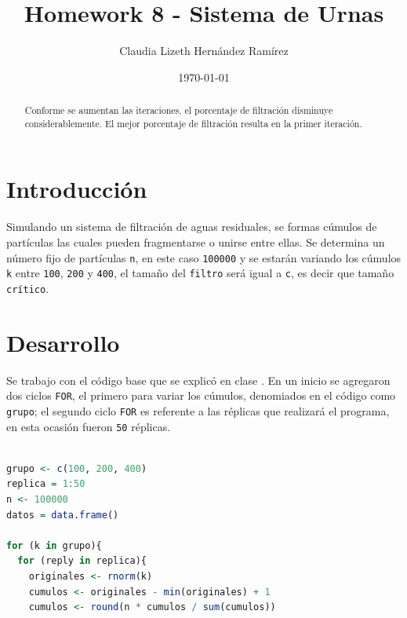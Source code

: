\documentclass{article}
\author{Claudia Lizeth Hern\'andez Ram\'irez} %
\title{Homework 8 - Sistema de Urnas} %
\date{\today}
\begin{document}

\maketitle %

\begin{abstract} %
  \centering
Conforme se aumentan las iteraciones, el porcentaje de filtraci\'on disminuye considerablemente. El mejor porcentaje de filtraci\'on resulta en la primer iteraci\'on.
  
\end{abstract}


\section{Introducci\'{o}n}\label{intro} %
Simulando un sistema de filtraci\'on de aguas residuales, se formas c\'umulos de part\'iculas las cuales pueden fragmentarse o unirse entre ellas. Se determina un n\'umero fijo de part\'iculas \texttt{n}, en este caso \texttt{100000} y se estar\'an variando los c\'umulos \texttt{k} entre \texttt{100}, \texttt{200} y \texttt{400}, el tamaño del \texttt{filtro} ser\'a igual a \texttt{c}, es decir que tamaño \texttt{cr\'itico}.



\section{Desarrollo}\label{desarrollo} %

Se trabajo con el c\'odigo base que se explic\'o en clase \cite{Cbase}. En un inicio se agregaron dos ciclos \texttt{FOR}, el primero para variar los c\'umulos, denomiados en el c\'odigo como \texttt{grupo}; el segundo ciclo \texttt{FOR} es referente a las r\'eplicas que realizar\'a el programa, en esta ocasi\'on fueron \texttt{50} r\'eplicas.


\begin{lstlisting}[language=R, caption= Segmento de c\'odigo ciclos \texttt{FOR} para c\'umulos y repeticiones.]

grupo <- c(100, 200, 400)
replica = 1:50
n <- 100000
datos = data.frame()

for (k in grupo){
  for (reply in replica){
    originales <- rnorm(k)
    cumulos <- originales - min(originales) + 1
    cumulos <- round(n * cumulos / sum(cumulos))

\end{lstlisting}
\end{document}
